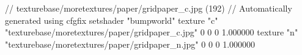 // texturebase/moretextures/paper/gridpaper_c.jpg (192)
// Automatically generated using cfgfix
setshader "bumpworld"
texture "c" "texturebase/moretextures/paper/gridpaper_c.jpg" 0 0 0 1.000000
texture "n" "texturebase/moretextures/paper/gridpaper_n.jpg" 0 0 0 1.000000
